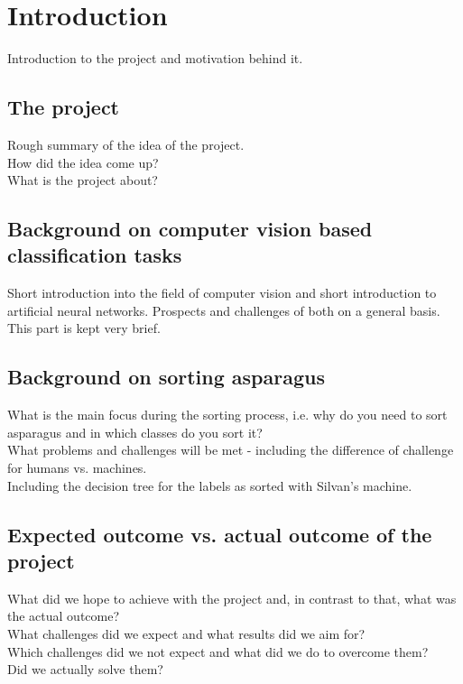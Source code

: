 \section{Introduction}

Introduction to the project and motivation behind it. \\

\subsection{The project}

Rough summary of the idea of the project. \\
How did the idea come up? \\
What is the project about?

\subsection{Background on computer vision based classification tasks}

Short introduction into the field of computer vision and short introduction to artificial neural networks. Prospects and challenges of both on a general basis. \\
This part is kept very brief.

\subsection{Background on sorting asparagus}

What is the main focus during the sorting process, i.e. why do you need to sort asparagus and in which classes do you sort it? \\
What problems and challenges will be met - including the difference of challenge for humans vs. machines. \\
Including the decision tree for the labels as sorted with Silvan’s machine.

\subsection{Expected outcome vs. actual outcome of the project}

What did we hope to achieve with the project and, in contrast to that, what was the actual outcome? \\
What challenges did we expect and what results did we aim for? \\
Which challenges did we not expect and what did we do to overcome them? \\
Did we actually solve them?